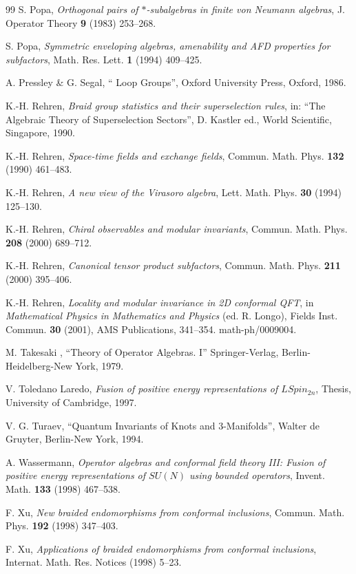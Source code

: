 \documentclass[12pt]{article}
\begin{document}
{\begin{thebibliography}{99}
S. Popa, 
{\it Orthogonal pairs of $*$-subalgebras in finite von Neumann algebras},
J. Operator Theory {\bf 9} (1983) 253--268.

S. Popa, {\it Symmetric enveloping algebras, amenability and AFD
properties for subfactors}, Math. Res. Lett.
{\bf 1} (1994) 409--425.

 A. Pressley \& G. Segal, `` Loop Groups'',
Oxford University Press, Oxford, 1986.

K.-H.  Rehren,
{\it Braid group statistics and their superselection rules}, 
in: ``The Algebraic Theory of Superselection Sectors'', D.  Kastler ed.,
World Scientific, Singapore, 1990.

K.-H. Rehren,
{\it Space-time fields and exchange fields},
Commun. Math. Phys. {\bf 132} (1990) 461--483.

K.-H. Rehren,
{\it A new view of the Virasoro algebra},
Lett. Math. Phys. {\bf 30} (1994) 125--130.

K.-H. Rehren, 
{\it Chiral observables and modular invariants},
Commun. Math. Phys.  {\bf 208} (2000) 689--712.

K.-H. Rehren, 
{\it Canonical tensor product subfactors},
Commun. Math. Phys. {\bf 211} (2000) 395--406.

K.-H. Rehren, 
{\it Locality and modular invariance in 2D conformal QFT},
in {\em Mathematical Physics in Mathematics and Physics} (ed. R. Longo),
Fields Inst. Commun. {\bf 30} (2001), AMS Publications, 341--354.
math-ph/0009004.

M. Takesaki , ``Theory of Operator Algebras. I'' Springer-Verlag,
Berlin-Heidelberg-New York, 1979.

 V. Toledano Laredo,
{\it Fusion of positive energy representations of $LSpin_{2n}$},
Thesis, University of Cambridge, 1997.

  V. G. Turaev, ``Quantum Invariants of
Knots and 3-Manifolds'', Walter  de Gruyter, Berlin-New York, 1994.

 A. Wassermann,
{\it Operator algebras and conformal field theory III: Fusion
of positive energy representations of $SU(N)$ using bounded operators},
Invent. Math. {\bf 133} (1998) 467--538.

F. Xu,
{\it New braided endomorphisms from conformal inclusions},
Commun. Math. Phys. {\bf 192} (1998) 347--403.

F. Xu,
{\it Applications of braided endomorphisms from conformal inclusions}, 
Internat.  Math. Res. Notices (1998) 5--23.


\end{thebibliography}}
\end{document}
